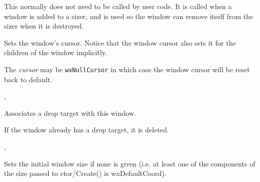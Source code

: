 \label{wxwindowsetcontainingsizer}


This normally does not need to be called by user code.  It is called
when a window is added to a sizer, and is used so the window can
remove itself from the sizer when it is destroyed.


\label{wxwindowsetcursor}


Sets the window's cursor. Notice that the window cursor also sets it for the
children of the window implicitly.

The {\it cursor} may be {\tt wxNullCursor} in which case the window cursor will
be reset back to default.




, 


\label{wxwindowsetdroptarget}


Associates a drop target with this window.

If the window already has a drop target, it is deleted.


,



\label{wxwindowsetinitialbestsize}


Sets the initial window size if none is given (i.e. at least one of the
components of the size passed to ctor/Create() is wxDefaultCoord).

\label{wxwindowseteventhandler}


